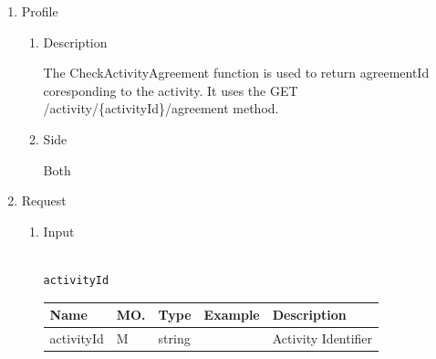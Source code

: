 \begin{enumerate}

\item Profile

\begin{enumerate}

\item Description

The CheckActivityAgreement function is used to return agreementId coresponding to the activity.  
It uses the GET /activity/\{activityId\}/agreement method. 

\item Side

Both

\end{enumerate}

\item Request

\begin{enumerate}

\item Input

\begin{tcolorbox}[boxrule=0pt, frame empty]
\begin{verbatim}

activityId

\end{verbatim}
\end{tcolorbox}





\begin{table}[H]
\footnotesize

\begin{center}
\begin{tabular}{|p{3cm}|l|p{3cm}|p{3cm}|p{4cm}|} 
\hline
\rowcolor{lightgray}	Name	& MO.	& Type	& Example & 	Description \\
\hline

activityId				& M	& 	string				&								&	Activity Identifier \\ 
\hline



\end{tabular}
\end{center}
\end{table}
\end{enumerate}
\end{enumerate}
